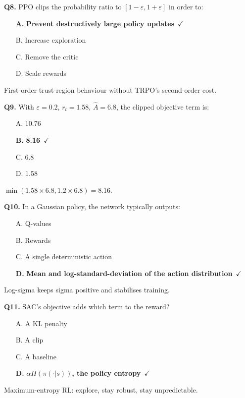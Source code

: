 \documentclass[11pt]{article}
\begin{document}
{\noindent\textbf{Q8.} PPO clips the probability ratio to $[1-\varepsilon,1+\varepsilon]$ in order to:\begin{itemize}[leftmargin=2.2em,itemsep=0pt,topsep=1pt]\item[\textbf{A.}] \textbf{Prevent destructively large policy updates}~{\color{GrnN}$\checkmark$}\item[B.] Increase exploration\item[C.] Remove the critic\item[D.] Scale rewards\end{itemize} First-order trust-region behaviour without TRPO's second-order cost.\par\medskip

\noindent\textbf{Q9.} With $\varepsilon=0.2$, $r_t=1.58$, $\hat A=6.8$, the clipped objective term is:\begin{itemize}[leftmargin=2.2em,itemsep=0pt,topsep=1pt]\item[A.] 10.76\item[\textbf{B.}] \textbf{8.16}~{\color{GrnN}$\checkmark$}\item[C.] 6.8\item[D.] 1.58\end{itemize} $\min(1.58\times6.8,1.2\times6.8)=8.16$.\par\medskip

\noindent\textbf{Q10.} In a Gaussian policy, the network typically outputs:\begin{itemize}[leftmargin=2.2em,itemsep=0pt,topsep=1pt]\item[A.] Q-values\item[B.] Rewards\item[C.] A single deterministic action\item[\textbf{D.}] \textbf{Mean and log-standard-deviation of the action distribution}~{\color{GrnN}$\checkmark$}\end{itemize} Log-sigma keeps sigma positive and stabilises training.\par\medskip

\noindent\textbf{Q11.} SAC's objective adds which term to the reward?\begin{itemize}[leftmargin=2.2em,itemsep=0pt,topsep=1pt]\item[A.] A KL penalty\item[B.] A clip\item[C.] A baseline\item[\textbf{D.}] \textbf{$\alpha H(\pi(\cdot|s))$, the policy entropy}~{\color{GrnN}$\checkmark$}\end{itemize} Maximum-entropy RL: explore, stay robust, stay unpredictable.\par\medskip

}
\end{document}
